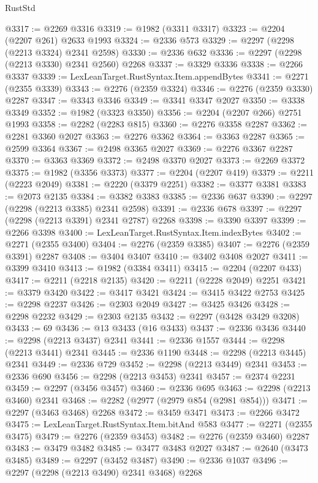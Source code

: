 \begin{lexlean}{RustStd}
\begin{coremodule}
@3317 := @2269 @3316
@3319 := @1982 (@3311 @3317)
@3323 := @2204 (@2207 @261) @2633 @1993
@3324 := @2336 @573
@3329 := @2297 (@2298 (@2213 @3324) @2341 @2598)
@3330 := @2336 @632
@3336 := @2297 (@2298 (@2213 @3330) @2341 @2560) @2268
@3337 := @3329 @3336
@3338 := @2266 @3337
@3339 := LexLeanTarget.RustSyntax.Item.appendBytes
@3341 := @2271 (@2355 @3339)
@3343 := @2276 (@2359 @3324)
@3346 := @2276 (@2359 @3330) @2287
@3347 := @3343 @3346
@3349 := @3341 @3347 @2027
@3350 := @3338 @3349
@3352 := @1982 (@3323 @3350)
@3356 := @2204 (@2207 @266) @2751 @1993
@3358 := @2282 (@2283 @815)
@3360 := @2276 @3358 @2287
@3362 := @2281 @3360 @2027
@3363 := @2276 @3362
@3364 := @3363 @2287
@3365 := @2599 @3364
@3367 := @2498 @3365 @2027
@3369 := @2276 @3367 @2287
@3370 := @3363 @3369
@3372 := @2498 @3370 @2027
@3373 := @2269 @3372
@3375 := @1982 (@3356 @3373)
@3377 := @2204 (@2207 @419)
@3379 := @2211 (@2223 @2049)
@3381 := @2220 (@3379 @2251)
@3382 := @3377 @3381
@3383 := @2073 @2135
@3384 := @3382 @3383
@3385 := @2336 @637
@3390 := @2297 (@2298 (@2213 @3385) @2341 @2598)
@3391 := @2336 @678
@3397 := @2297 (@2298 (@2213 @3391) @2341 @2787) @2268
@3398 := @3390 @3397
@3399 := @2266 @3398
@3400 := LexLeanTarget.RustSyntax.Item.indexBytes
@3402 := @2271 (@2355 @3400)
@3404 := @2276 (@2359 @3385)
@3407 := @2276 (@2359 @3391) @2287
@3408 := @3404 @3407
@3410 := @3402 @3408 @2027
@3411 := @3399 @3410
@3413 := @1982 (@3384 @3411)
@3415 := @2204 (@2207 @433)
@3417 := @2211 (@2218 @2135)
@3420 := @2211 (@2228 @2049) @2251
@3421 := @3379 @3420
@3422 := @3417 @3421
@3424 := @3415 @3422 @2753
@3425 := @2298 @2237
@3426 := @2303 @2049
@3427 := @3425 @3426
@3428 := @2298 @2232
@3429 := @2303 @2135
@3432 := @2297 (@3428 @3429 @3208)
@3433 := 69
@3436 := @13 @3433 (@16 @3433)
@3437 := @2336 @3436
@3440 := @2298 (@2213 @3437) @2341
@3441 := @2336 @1557
@3444 := @2298 (@2213 @3441) @2341
@3445 := @2336 @1190
@3448 := @2298 (@2213 @3445) @2341
@3449 := @2336 @729
@3452 := @2298 (@2213 @3449) @2341
@3453 := @2336 @690
@3456 := @2298 (@2213 @3453) @2341
@3457 := @2374 @2231
@3459 := @2297 (@3456 @3457)
@3460 := @2336 @695
@3463 := @2298 (@2213 @3460) @2341
@3468 := @2282 (@2977 (@2979 @854 (@2981 @854)))
@3471 := @2297 (@3463 @3468) @2268
@3472 := @3459 @3471
@3473 := @2266 @3472
@3475 := LexLeanTarget.RustSyntax.Item.bitAnd @583
@3477 := @2271 (@2355 @3475)
@3479 := @2276 (@2359 @3453)
@3482 := @2276 (@2359 @3460) @2287
@3483 := @3479 @3482
@3485 := @3477 @3483 @2027
@3487 := @2640 (@3473 @3485)
@3489 := @2297 (@3452 @3487)
@3490 := @2336 @1037
@3496 := @2297 (@2298 (@2213 @3490) @2341 @3468) @2268

\end{coremodule}
\end{lexlean}

